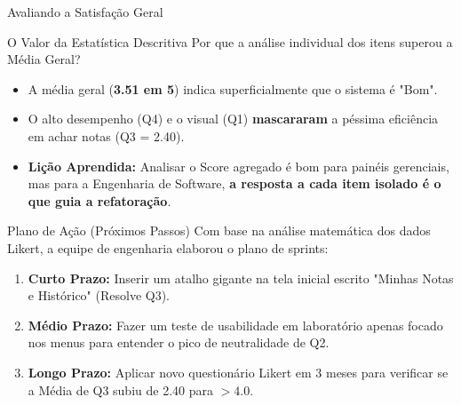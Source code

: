 \documentclass[aspectratio=169]{beamer}
\begin{document}
\begin{frame}{Avaliando a Satisfação Geral}
\begin{center}
    \end{center}
\end{frame}

\begin{frame}{O Valor da Estatística Descritiva}
    Por que a análise individual dos itens superou a Média Geral?
    \vspace{0.5cm}
    \begin{itemize}
        \item A média geral (\textbf{3.51 em 5}) indica superficialmente que o sistema é "Bom".
        \item O alto desempenho (Q4) e o visual (Q1) \textbf{mascararam} a péssima eficiência em achar notas (Q3 = 2.40).
        \item \textbf{Lição Aprendida:} Analisar o Score agregado é bom para painéis gerenciais, mas para a Engenharia de Software, \textbf{a resposta a cada item isolado é o que guia a refatoração}.
    \end{itemize}
\end{frame}

\begin{frame}{Plano de Ação (Próximos Passos)}
    Com base na análise matemática dos dados Likert, a equipe de engenharia elaborou o plano de sprints:
    \vspace{0.4cm}
    \begin{enumerate}
        \item \textbf{Curto Prazo:} Inserir um atalho gigante na tela inicial escrito "Minhas Notas e Histórico" (Resolve Q3).
        \item \textbf{Médio Prazo:} Fazer um teste de usabilidade em laboratório apenas focado nos menus para entender o pico de neutralidade de Q2.
        \item \textbf{Longo Prazo:} Aplicar novo questionário Likert em 3 meses para verificar se a Média de Q3 subiu de 2.40 para $> 4.0$.
    \end{enumerate}
\end{frame}
\end{document}
